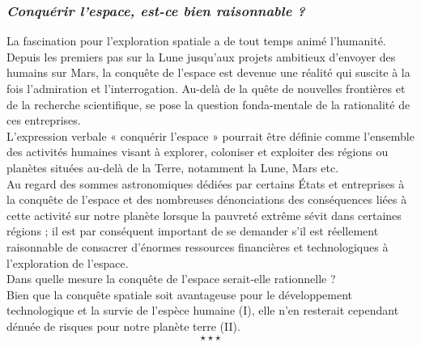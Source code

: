 \begin{center}
	\subsubsection*{\textit{Conquérir l'espace, est-ce bien raisonnable ?}}
\end{center}
\hspace*{0.5cm}La fascination pour l’exploration spatiale a de tout temps animé l’humanité. Depuis les premiers pas sur la Lune jusqu'aux projets ambitieux d'envoyer des humains sur Mars, la conquête de l'espace est devenue une réalité qui suscite à la fois l'admiration et l'interrogation. Au-delà de la quête de nouvelles frontières et de la recherche scientifique, se pose la question fonda-mentale de la rationalité de ces entreprises. \\
\hspace*{0.5cm}L’expression verbale « conquérir l'espace » pourrait être définie comme l'ensemble des activités humaines visant à explorer, coloniser et exploiter des régions ou planètes situées au-delà de la Terre, notamment la Lune, Mars etc.\\
\hspace*{0.5cm}Au regard des sommes astronomiques dédiées par certains États et entreprises à la conquête de l’espace et des nombreuses dénonciations des conséquences liées à cette activité sur notre planète lorsque la pauvreté extrême sévit dans certaines régions ; il est par conséquent important de se demander s’il est réellement raisonnable de consacrer d'énormes ressources financières et technologiques à l'exploration de l'espace.\\
\hspace*{0.5cm}Dans quelle mesure la conquête de l’espace serait-elle rationnelle ?\\
\hspace*{0.5cm}Bien que la conquête spatiale soit avantageuse pour le développement technologique et la survie de l’espèce humaine (I), elle n’en resterait cependant dénuée de risques pour notre planète terre (II).
$$\star \star \star$$
